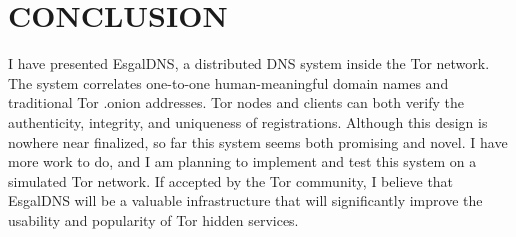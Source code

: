 
\chapter{\uppercase{Conclusion}}

I have presented EsgalDNS, a distributed DNS system inside the Tor network. The system correlates one-to-one human-meaningful domain names and traditional Tor .onion addresses. Tor nodes and clients can both verify the authenticity, integrity, and uniqueness of registrations. Although this design is nowhere near finalized, so far this system seems both promising and novel. I have more work to do, and I am planning to implement and test this system on a simulated Tor network. If accepted by the Tor community, I believe that EsgalDNS will be a valuable infrastructure that will significantly improve the usability and popularity of Tor hidden services.